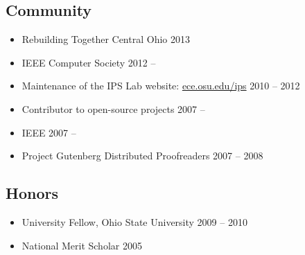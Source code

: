 \documentclass[12pt]{report}
\begin{document}
\subsection*{Community}
\begin{itemize}
\item Rebuilding Together Central Ohio                                                   \hfill 2013
\item IEEE Computer Society                                                              \hfill 2012 -- ~~~~~~~
\item Maintenance of the IPS Lab website: \href{http://ece.osu.edu/ips}{ece.osu.edu/ips} \hfill 2010 -- 2012
\item Contributor to open-source projects                                                \hfill 2007 -- ~~~~~~~
\item IEEE                                                                               \hfill 2007 -- ~~~~~~~
\item Project Gutenberg Distributed Proofreaders                                         \hfill 2007 -- 2008
\end{itemize}

\subsection*{Honors}
\begin{itemize}
\item University Fellow, Ohio State University \hfill 2009 -- 2010
\item National Merit Scholar                   \hfill 2005
\end{itemize}
\end{document}

